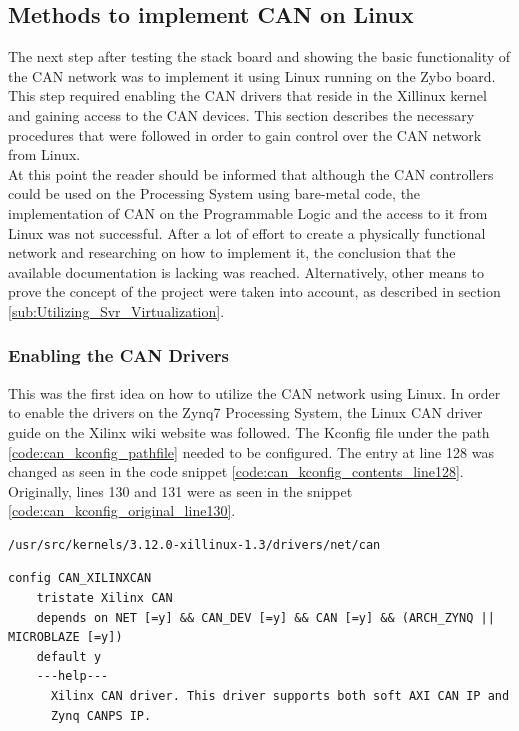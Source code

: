 \subsection{Methods to implement CAN on Linux}

The next step after testing the stack board and showing the basic functionality of the CAN network was to implement it using Linux running on the Zybo board.
This step required enabling the CAN drivers that reside in the Xillinux kernel and gaining access to the CAN devices.
This section describes the necessary procedures that were followed in order to gain control over the CAN network from Linux.
\\
At this point the reader should be informed that although the CAN controllers could be used on the Processing System using bare-metal code, the implementation of CAN on the Programmable Logic and the access to it from Linux was not successful.
After a lot of effort to create a physically functional network and researching on how to implement it, the conclusion that the available documentation is lacking was reached.
Alternatively, other means to prove the concept of the project were taken into account, as described in section \ref{sub:Utilizing_Svr_Virtualization}.

\subsubsection{Enabling the CAN Drivers}

This was the first idea on how to utilize the CAN network using Linux.
In order to enable the drivers on the Zynq7 Processing System, the Linux CAN driver guide \cite{Xilinx_wiki_Linux_CAN_driver} on the Xilinx wiki website \cite{Xilinx_wiki} was followed.
The Kconfig file under the path \ref{code:can_kconfig_pathfile} needed to be configured.
The entry at line 128 was changed as seen in the code snippet \ref{code:can_kconfig_contents_line128}.
Originally, lines 130 and 131 were as seen in the snippet \ref{code:can_kconfig_original_line130}.

\begin{lstlisting}[caption={CAN Kconfig pathfile.},numbers=none,label=code:can_kconfig_pathfile]
/usr/src/kernels/3.12.0-xillinux-1.3/drivers/net/can
\end{lstlisting}

\begin{lstlisting}[firstnumber=128,caption={Kconfig file contents from line 128.},label=code:can_kconfig_contents128]
config CAN_XILINXCAN
	tristate Xilinx CAN
	depends on NET [=y] && CAN_DEV [=y] && CAN [=y] && (ARCH_ZYNQ || MICROBLAZE [=y])
	default y
	---help---
	  Xilinx CAN driver. This driver supports both soft AXI CAN IP and
	  Zynq CANPS IP.
\end{lstlisting}

